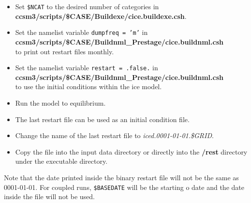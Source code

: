 \begin{itemize}
  \item Set {\tt \$NCAT} to the desired number of categories in \\
        {\bf ccsm3/scripts/\$CASE/Buildexe/cice.buildexe.csh}.
  \item Set the namelist variable {\tt dumpfreq = 'm'} in \\
        {\bf ccsm3/scripts/\$CASE/Buildnml\_Prestage/cice.buildnml.csh} \\
        to print out restart files monthly.
  \item Set the namelist variable {\tt restart = .false.} in 
        {\bf ccsm3/scripts/\$CASE/Buildnml\_Prestage/cice.buildnml.csh} \\
        to use the initial conditions within the ice model.
  \item Run the model to equilibrium. 
  \item The last restart file can be used as an initial condition file.
  \item Change the name of the last restart file to {\it iced.0001-01-01.\$GRID}.
  \item Copy the file into the input data directory or directly into the 
        {\bf /rest} directory under the executable directory.
\end{itemize}

Note that the date printed inside the binary restart file will not be the 
same as 0001-01-01.  For coupled runs, {\tt \$BASEDATE} will be the starting o
date and the date inside the file will not be used.  

